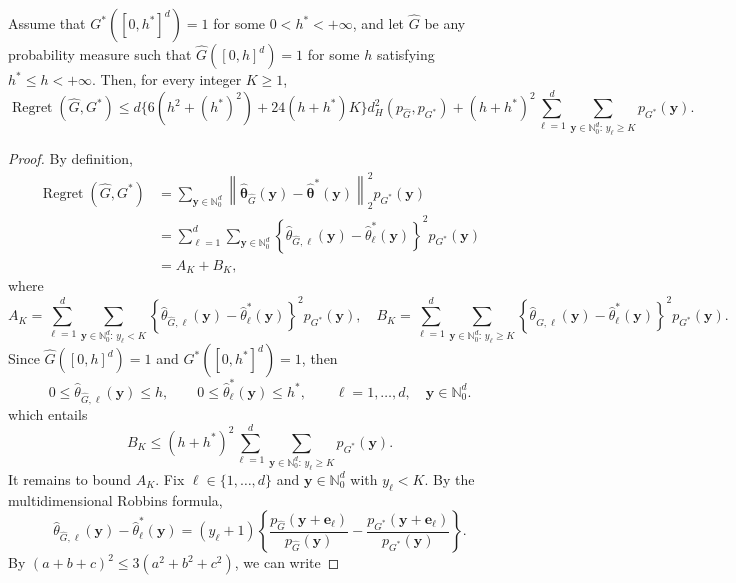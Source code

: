 \documentclass[10pt,a4paper]{amsart}
\begin{document}
\begin{lem}
\label{lem:regret-density-d}
Assume that $G^\ast([0,h^\ast]^d)=1$ for some $0<h^\ast<+\infty$,
and let $\widehat G$ be any probability measure such that
$\widehat G([0,h]^d)=1$ for some $h$ satisfying
$h^\ast\leq h<+\infty$. Then, for every integer $K\geq 1$,
\[
\operatorname{Regret}(\widehat G,G^\ast)
\leq
d\Big\{
6(h^2+(h^\ast)^2)+24(h+h^\ast)K
\Big\}
d_H^2(p_{\widehat G},p_{G^\ast})
+
(h+h^\ast)^2
\sum_{\ell=1}^d
\sum_{\boldsymbol y\in\mathbb N_0^d:\,y_\ell\geq K}
p_{G^\ast}(\boldsymbol y).
\]
\end{lem}

\begin{proof}
By definition,
\begin{align*}
    \operatorname{Regret}(\widehat G,G^\ast)
&=
\sum_{\boldsymbol y\in\mathbb N_0^d}
\left\|
\hat{\boldsymbol\theta}_{\widehat G}(\boldsymbol y)
-
\hat{\boldsymbol\theta}^\ast(\boldsymbol y)
\right\|_2^2
p_{G^\ast}(\boldsymbol y)\\
&=
\sum_{\ell=1}^d
\sum_{\boldsymbol y\in\mathbb N_0^d}
\left\{
\hat\theta_{\widehat G,\ell}(\boldsymbol y)
-
\hat\theta_\ell^\ast(\boldsymbol y)
\right\}^2
p_{G^\ast}(\boldsymbol y)\\
&=A_K+B_K,
\end{align*}
where
\[
A_K
=
\sum_{\ell=1}^d
\sum_{\boldsymbol y\in\mathbb N_0^d:\,y_\ell<K}
\left\{
\hat\theta_{\widehat G,\ell}(\boldsymbol y)
-
\hat\theta_\ell^\ast(\boldsymbol y)
\right\}^2
p_{G^\ast}(\boldsymbol y)
,\quad
B_K
=
\sum_{\ell=1}^d
\sum_{\boldsymbol y\in\mathbb N_0^d:\,y_\ell\geq K}
\left\{
\hat\theta_{\widehat G,\ell}(\boldsymbol y)
-
\hat\theta_\ell^\ast(\boldsymbol y)
\right\}^2
p_{G^\ast}(\boldsymbol y).
\]
Since $\widehat G([0,h]^d)=1$ and $G^\ast([0,h^\ast]^d)=1$, then
\[
0\leq \hat\theta_{\widehat G,\ell}(\boldsymbol y)\leq h,
\qquad
0\leq \hat\theta_\ell^\ast(\boldsymbol y)\leq h^\ast,
\qquad
\ell=1,\ldots,d,\quad \boldsymbol y\in\mathbb N_0^d.
\]
which entails 
\[
B_K
\leq
(h+h^\ast)^2
\sum_{\ell=1}^d
\sum_{\boldsymbol y\in\mathbb N_0^d:\,y_\ell\geq K}
p_{G^\ast}(\boldsymbol y).
\]
It remains to bound $A_K$. Fix $\ell\in\{1,\ldots,d\}$ and
$\boldsymbol y\in\mathbb N_0^d$ with $y_\ell<K$. By the multidimensional
Robbins formula,
\[
\hat\theta_{\widehat G,\ell}(\boldsymbol y)
-
\hat\theta_\ell^\ast(\boldsymbol y)
=
(y_\ell+1)
\left\{
\frac{p_{\widehat G}(\boldsymbol y+\boldsymbol e_\ell)}
     {p_{\widehat G}(\boldsymbol y)}
-
\frac{p_{G^\ast}(\boldsymbol y+\boldsymbol e_\ell)}
     {p_{G^\ast}(\boldsymbol y)}
\right\}.
\]
By $(a+b+c)^2\leq 3(a^2+b^2+c^2)$, we can write


\end{proof}
\end{document}
